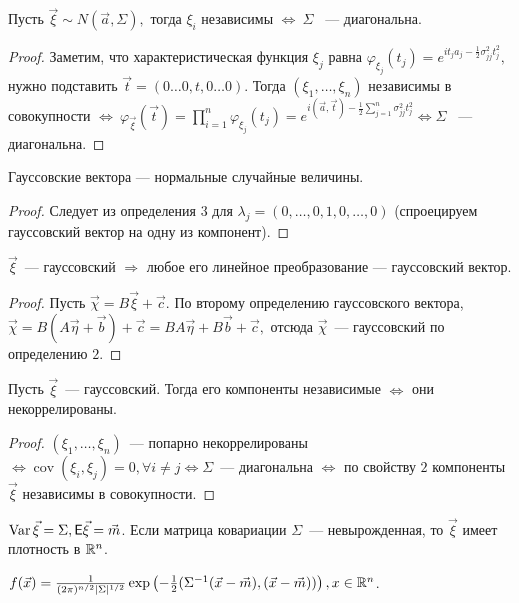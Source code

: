 	\begin{property}
		Пусть \(\vec{\xi}\sim N(\vec{a}, \Sigma),\) тогда \(\xi_i\) независимы \(\Leftrightarrow~\Sigma\) ~--- диагональна.
		\begin{proof}
			Заметим, что характеристическая функция \(\xi_j\) равна \(\varphi_{\xi_j}(t_j) = e^{it_ja_j - \frac{1}{2}\sigma^2_{jj}t_j^2},\) нужно подставить \(\vec{t} = (0\ldots0, t, 0\ldots0).\) Тогда \((\xi_1, \ldots, \xi_n)\) независимы в совокупности \(\Leftrightarrow ~ \varphi_{\vec{\xi}}(\vec{t}) = \prod\limits_{i =1 }^n \varphi_{\xi_j}(t_j) = e^{i(\vec{a}, \vec{t}) - \frac{1}{2}\sum\limits_{j = 1}^{n}\sigma_{jj}^2t_j^2} \Leftrightarrow \Sigma\) ~--- диагональна.
		\end{proof}
	\end{property}

	\begin{property}[Коши]
		Гауссовские вектора --- нормальные случайные величины.
		\begin{proof}
			Следует из определения \(3\) для \(\lambda_j = (0, \ldots, 0, 1, 0, \ldots, 0)\) (спроецируем гауссовский вектор на одну из компонент).
		\end{proof}
	\end{property}

	\begin{property}
		\(\vec{\xi}\)~--- гауссовский \(\Rightarrow\) любое его линейное преобразование --- гауссовский вектор.
		\begin{proof}
			Пусть \(\vec{\chi} = B\vec{\xi} + \vec{c}.\) По второму определению гауссовского вектора, \(\vec{\chi} = B(A\vec{\eta} + \vec{b}) + \vec{c} = BA\vec{\eta} + B\vec{b} + \vec{c},\) отсюда \(\vec{\chi}\)~--- гауссовский по определению \(2.\)
		\end{proof}
	\end{property}
	
	\begin{property}
		Пусть \(\vec{\xi}\)~--- гауссовский. Тогда его компоненты независимые \(\Leftrightarrow\) они некоррелированы.
		\begin{proof}
			\((\xi_1, \ldots, \xi_n)\)~--- попарно некоррелированы \(\Leftrightarrow \operatorname{cov}(\xi_i, \xi_j) = 0, \forall i \neq j \Leftrightarrow \Sigma\)~--- диагональна \(\Leftrightarrow\) по свойству \(2\) компоненты \(\vec{\xi}\) независимы в совокупности.
		\end{proof}
	\end{property}
	
    \begin{property}
    	$\operatorname{Var} \vec{\xi} = \Sigma, \mathsf{E}\vec{\xi} = \vec{m}$. Если матрица ковариации $\Sigma$~--- невырожденная, то $\vec{\xi}$ имеет плотность в $\mathbb{R}^n$.
    	
    	$f(\vec{x}) = \frac{1}{(2\pi)^{n / 2}|\Sigma|^{1/2}} \exp\left(-\frac{1}{2}(\Sigma^{-1}(\vec{x} - \vec{m}), (\vec{x} - \vec{m}))\right), x \in \mathbb{R}^n$.
    \end{property}

